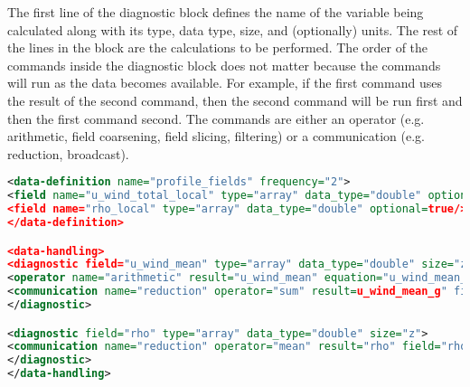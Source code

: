 The first line of the diagnostic block defines the name of the variable being calculated along with its type, data type, size, and (optionally) units. The rest of the lines in the block are the calculations to be performed. The order of the commands inside the diagnostic block does not matter because the commands will run as the data becomes available. For example, if the first command uses the result of the second command, then the second command will be run first and then the first command second. The commands are either an operator (e.g. arithmetic, field coarsening, field slicing, filtering) or a communication (e.g. reduction, broadcast). \citep{brown2018,moncCode}
\newpage
\begin{lstlisting}[language=XML,caption=Example of MONC I/O data-handling block. Two prognostic data fields (\textit{u\_wind\_total\_local} and \textit{rho\_local}) are used to calculate two diagnostic data fields (\textit{u\_wind\_mean} and \textit{rho}) through a combination of operator and communication commands. The data-definition block is also included to show what prognostic data is being used.,label={code:io_handling}]
<data-definition name="profile_fields" frequency="2">
<field name="u_wind_total_local" type="array" data_type="double" optional=true/>
<field name="rho_local" type="array" data_type="double" optional=true/>
</data-definition>

<data-handling>
<diagnostic field="u_wind_mean" type="array" data_type="double" size="zn" units="m/s">
<operator name="arithmetic" result="u_wind_mean" equation="u_wind_mean_g/({x_size}*{y_size})"/>
<communication name="reduction" operator="sum" result=u_wind_mean_g" field="u_wind_total_local" root="auto"/>
</diagnostic>

<diagnostic field="rho" type="array" data_type="double" size="z">
<communication name="reduction" operator="mean" result="rho" field="rho_local" root="auto"/>
</diagnostic>
</data-handling>
\end{lstlisting}

